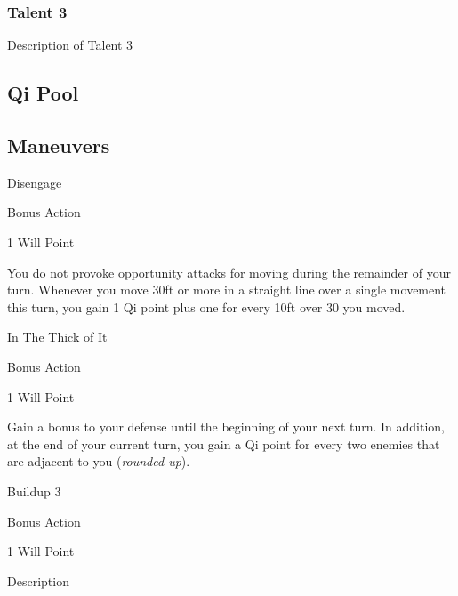 \subsubsection{Talent 3}
Description of Talent 3

\vspace{.1 in}

\subsection*{Qi Pool}
\lipsum[1]

\vspace{.1 in}

\subsection*{Maneuvers}
\lipsum[1]

\vspace{.25 in}
\begin{monsterbox}{Disengage}
	\hline
	\begin{monsteraction}[Action]
Bonus Action
	\end{monsteraction}
	\hspace{1cm}
	\begin{monsteraction}[Cost]
		1 Will Point
	\end{monsteraction}
	
	You do not provoke opportunity attacks for moving during the remainder of your turn. Whenever you move 30ft or more in a straight line over a single movement this turn, you gain 1 Qi point plus one for every 10ft over 30 you moved. 
\end{monsterbox}

\begin{monsterbox}{In The Thick of It}
	\hline
	\begin{monsteraction}[Action]
		Bonus Action
	\end{monsteraction}
	\hspace{1cm}
	\begin{monsteraction}[Cost]
		1 Will Point
	\end{monsteraction}
	
	Gain a bonus to your defense until the beginning of your next turn. In addition, at the end of your current turn, you gain a Qi point for every two enemies that are adjacent to you (\textit{rounded up}).
	
\end{monsterbox}

\begin{monsterbox}{Buildup 3}
	\hline
	\begin{monsteraction}[Action]
		Bonus Action
	\end{monsteraction}
	\hspace{1cm}
	\begin{monsteraction}[Cost]
		1 Will Point
	\end{monsteraction}
	
	Description
	
\end{monsterbox}

